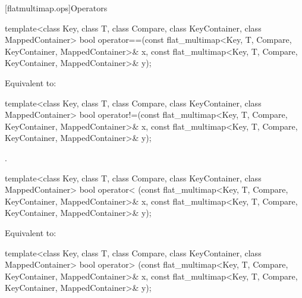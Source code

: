 \begin{codeblock}
\begin{codeblock}
\begin{codeblock}
\begin{addedblock}
[flatmultimap.ops]{Operators}

%
\begin{itemdecl}
template<class Key, class T, class Compare, class KeyContainer, class MappedContainer>
  bool operator==(const flat_multimap<Key, T, Compare, KeyContainer, MappedContainer>& x,
                  const flat_multimap<Key, T, Compare, KeyContainer, MappedContainer>& y);
\end{itemdecl}

\begin{itemdescr}
\pnum
\effects Equivalent to:
\end{itemdescr}

%
\begin{itemdecl}
template<class Key, class T, class Compare, class KeyContainer, class MappedContainer>
  bool operator!=(const flat_multimap<Key, T, Compare, KeyContainer, MappedContainer>& x,
                  const flat_multimap<Key, T, Compare, KeyContainer, MappedContainer>& y);
\end{itemdecl}

\begin{itemdescr}
\pnum \returns {}.
\end{itemdescr}

%
\begin{itemdecl}
template<class Key, class T, class Compare, class KeyContainer, class MappedContainer>
  bool operator< (const flat_multimap<Key, T, Compare, KeyContainer, MappedContainer>& x,
                  const flat_multimap<Key, T, Compare, KeyContainer, MappedContainer>& y);
\end{itemdecl}

\begin{itemdescr}
\pnum
\effects Equivalent to:
\end{itemdescr}

%
\begin{itemdecl}
template<class Key, class T, class Compare, class KeyContainer, class MappedContainer>
  bool operator> (const flat_multimap<Key, T, Compare, KeyContainer, MappedContainer>& x,
                  const flat_multimap<Key, T, Compare, KeyContainer, MappedContainer>& y);
\end{itemdecl}


\end{addedblock}
\end{codeblock}
\end{codeblock}
\end{codeblock}
